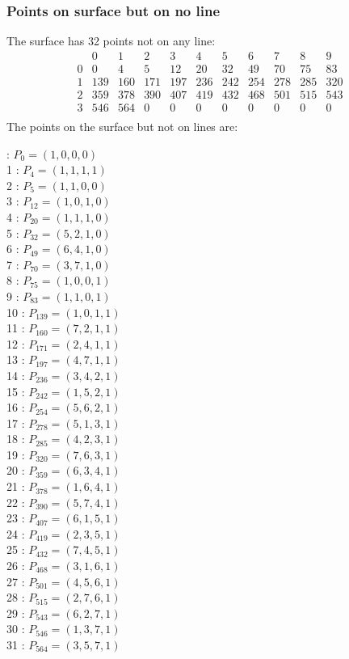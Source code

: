 \documentclass{article}
\begin{document}
{\subsubsection*{Points on surface but on no line}
The surface has 32 points not on any line:\\
$$
\begin{array}{r|*{10}{r}}
 & 0 & 1 & 2 & 3 & 4 & 5 & 6 & 7 & 8 & 9\\
\hline
0 & 0 & 4 & 5 & 12 & 20 & 32 & 49 & 70 & 75 & 83\\
1 & 139 & 160 & 171 & 197 & 236 & 242 & 254 & 278 & 285 & 320\\
2 & 359 & 378 & 390 & 407 & 419 & 432 & 468 & 501 & 515 & 543\\
3 & 546 & 564 & 0 & 0 & 0 & 0 & 0 & 0 & 0 & 0\\
\end{array}
$$
The points on the surface but not on lines are:\\
\begin{multicols}{2}
 : $P_{0}=( 1, 0, 0, 0 )$\\
1 : $P_{4}=( 1, 1, 1, 1 )$\\
2 : $P_{5}=( 1, 1, 0, 0 )$\\
3 : $P_{12}=( 1, 0, 1, 0 )$\\
4 : $P_{20}=( 1, 1, 1, 0 )$\\
5 : $P_{32}=( 5, 2, 1, 0 )$\\
6 : $P_{49}=( 6, 4, 1, 0 )$\\
7 : $P_{70}=( 3, 7, 1, 0 )$\\
8 : $P_{75}=( 1, 0, 0, 1 )$\\
9 : $P_{83}=( 1, 1, 0, 1 )$\\
10 : $P_{139}=( 1, 0, 1, 1 )$\\
11 : $P_{160}=( 7, 2, 1, 1 )$\\
12 : $P_{171}=( 2, 4, 1, 1 )$\\
13 : $P_{197}=( 4, 7, 1, 1 )$\\
14 : $P_{236}=( 3, 4, 2, 1 )$\\
15 : $P_{242}=( 1, 5, 2, 1 )$\\
16 : $P_{254}=( 5, 6, 2, 1 )$\\
17 : $P_{278}=( 5, 1, 3, 1 )$\\
18 : $P_{285}=( 4, 2, 3, 1 )$\\
19 : $P_{320}=( 7, 6, 3, 1 )$\\
20 : $P_{359}=( 6, 3, 4, 1 )$\\
21 : $P_{378}=( 1, 6, 4, 1 )$\\
22 : $P_{390}=( 5, 7, 4, 1 )$\\
23 : $P_{407}=( 6, 1, 5, 1 )$\\
24 : $P_{419}=( 2, 3, 5, 1 )$\\
25 : $P_{432}=( 7, 4, 5, 1 )$\\
26 : $P_{468}=( 3, 1, 6, 1 )$\\
27 : $P_{501}=( 4, 5, 6, 1 )$\\
28 : $P_{515}=( 2, 7, 6, 1 )$\\
29 : $P_{543}=( 6, 2, 7, 1 )$\\
30 : $P_{546}=( 1, 3, 7, 1 )$\\
31 : $P_{564}=( 3, 5, 7, 1 )$\\
\end{multicols}
}
\end{document}
